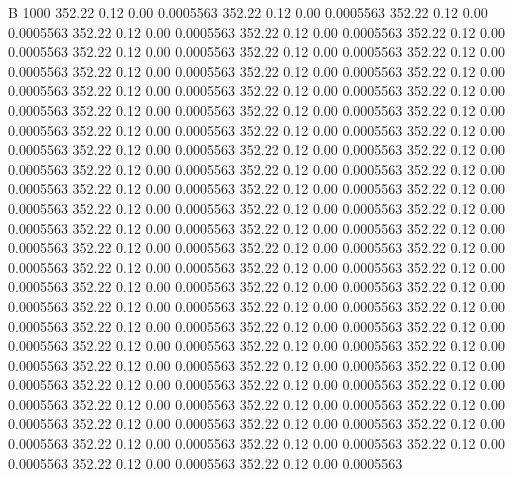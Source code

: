 


B 1000
 352.22    0.12    0.00   0.0005563
 352.22    0.12    0.00   0.0005563
 352.22    0.12    0.00   0.0005563
 352.22    0.12    0.00   0.0005563
 352.22    0.12    0.00   0.0005563
 352.22    0.12    0.00   0.0005563
 352.22    0.12    0.00   0.0005563
 352.22    0.12    0.00   0.0005563
 352.22    0.12    0.00   0.0005563
 352.22    0.12    0.00   0.0005563
 352.22    0.12    0.00   0.0005563
 352.22    0.12    0.00   0.0005563
 352.22    0.12    0.00   0.0005563
 352.22    0.12    0.00   0.0005563
 352.22    0.12    0.00   0.0005563
 352.22    0.12    0.00   0.0005563
 352.22    0.12    0.00   0.0005563
 352.22    0.12    0.00   0.0005563
 352.22    0.12    0.00   0.0005563
 352.22    0.12    0.00   0.0005563
 352.22    0.12    0.00   0.0005563
 352.22    0.12    0.00   0.0005563
 352.22    0.12    0.00   0.0005563
 352.22    0.12    0.00   0.0005563
 352.22    0.12    0.00   0.0005563
 352.22    0.12    0.00   0.0005563
 352.22    0.12    0.00   0.0005563
 352.22    0.12    0.00   0.0005563
 352.22    0.12    0.00   0.0005563
 352.22    0.12    0.00   0.0005563
 352.22    0.12    0.00   0.0005563
 352.22    0.12    0.00   0.0005563
 352.22    0.12    0.00   0.0005563
 352.22    0.12    0.00   0.0005563
 352.22    0.12    0.00   0.0005563
 352.22    0.12    0.00   0.0005563
 352.22    0.12    0.00   0.0005563
 352.22    0.12    0.00   0.0005563
 352.22    0.12    0.00   0.0005563
 352.22    0.12    0.00   0.0005563
 352.22    0.12    0.00   0.0005563
 352.22    0.12    0.00   0.0005563
 352.22    0.12    0.00   0.0005563
 352.22    0.12    0.00   0.0005563
 352.22    0.12    0.00   0.0005563
 352.22    0.12    0.00   0.0005563
 352.22    0.12    0.00   0.0005563
 352.22    0.12    0.00   0.0005563
 352.22    0.12    0.00   0.0005563
 352.22    0.12    0.00   0.0005563
 352.22    0.12    0.00   0.0005563
 352.22    0.12    0.00   0.0005563
 352.22    0.12    0.00   0.0005563
 352.22    0.12    0.00   0.0005563
 352.22    0.12    0.00   0.0005563
 352.22    0.12    0.00   0.0005563
 352.22    0.12    0.00   0.0005563
 352.22    0.12    0.00   0.0005563
 352.22    0.12    0.00   0.0005563
 352.22    0.12    0.00   0.0005563
 352.22    0.12    0.00   0.0005563
 352.22    0.12    0.00   0.0005563
 352.22    0.12    0.00   0.0005563
 352.22    0.12    0.00   0.0005563
 352.22    0.12    0.00   0.0005563
 352.22    0.12    0.00   0.0005563
 352.22    0.12    0.00   0.0005563
 352.22    0.12    0.00   0.0005563
 352.22    0.12    0.00   0.0005563
 352.22    0.12    0.00   0.0005563
 352.22    0.12    0.00   0.0005563
